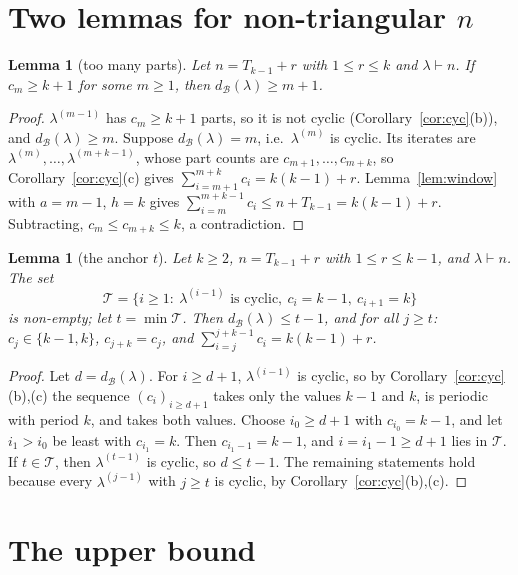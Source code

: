 \documentclass[11pt]{article}
\newtheorem{lemma}[theorem]{Lemma}
\theoremstyle{definition}
\newcommand{\dB}{d_{\mathcal{B}}}
\renewcommand{\le}{\leqslant}
\renewcommand{\ge}{\geqslant}
\begin{document}
\section{Two lemmas for non-triangular $n$}\label{sec:c3lemmas}

\begin{lemma}[too many parts]\label{lem:overfull}
Let $n=T_{k-1}+r$ with $1\le r\le k$ and $\lambda\vdash n$.  If $c_m\ge k+1$ for some $m\ge1$, then
$\dB(\lambda)\ge m+1$.
\end{lemma}
\begin{proof}
$\lambda^{(m-1)}$ has $c_m\ge k+1$ parts, so it is not cyclic (Corollary~\ref{cor:cyc}(b)), and $\dB(\lambda)\ge m$.
Suppose $\dB(\lambda)=m$, i.e.\ $\lambda^{(m)}$ is cyclic.  Its iterates are $\lambda^{(m)},\dots,\lambda^{(m+k-1)}$, whose part
counts are $c_{m+1},\dots,c_{m+k}$, so Corollary~\ref{cor:cyc}(c) gives $\sum_{i=m+1}^{m+k}c_i=k(k-1)+r$.
Lemma~\ref{lem:window} with $a=m-1$, $h=k$ gives $\sum_{i=m}^{m+k-1}c_i\le n+T_{k-1}=k(k-1)+r$.  Subtracting,
$c_m\le c_{m+k}\le k$, a contradiction.
\end{proof}

\begin{lemma}[the anchor $t$]\label{lem:anchor}
Let $k\ge2$, $n=T_{k-1}+r$ with $1\le r\le k-1$, and $\lambda\vdash n$.  The set
\[\mathcal T=\{i\ge1:\ \lambda^{(i-1)}\text{ is cyclic},\ c_i=k-1,\ c_{i+1}=k\}\]
is non-empty; let $t=\min\mathcal T$.  Then $\dB(\lambda)\le t-1$, and for all $j\ge t$:
$c_j\in\{k-1,k\}$, $c_{j+k}=c_j$, and $\sum_{i=j}^{j+k-1}c_i=k(k-1)+r$.
\end{lemma}
\begin{proof}
Let $d=\dB(\lambda)$.  For $i\ge d+1$, $\lambda^{(i-1)}$ is cyclic, so by Corollary~\ref{cor:cyc}(b),(c) the
sequence $(c_i)_{i\ge d+1}$ takes only the values $k-1$ and $k$, is periodic with period $k$, and takes both
values.  Choose $i_0\ge d+1$ with $c_{i_0}=k-1$, and let $i_1>i_0$ be least with $c_{i_1}=k$.  Then
$c_{i_1-1}=k-1$, and $i=i_1-1\ge d+1$ lies in $\mathcal T$.  If $t\in\mathcal T$, then $\lambda^{(t-1)}$ is cyclic, so
$d\le t-1$.  The remaining statements hold because every $\lambda^{(j-1)}$ with $j\ge t$ is cyclic, by
Corollary~\ref{cor:cyc}(b),(c).
\end{proof}

\section{The upper bound}\label{sec:c3upper}
\end{document}
